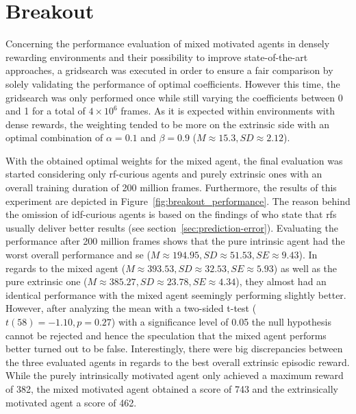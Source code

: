\documentclass[draft,final]{vutinfth} %
\begin{document}
    \section{Breakout}

    Concerning the performance evaluation of mixed motivated agents in densely rewarding environments and their possibility to improve state-of-the-art approaches, a gridsearch was executed in order to ensure a fair comparison by solely validating the performance of optimal coefficients.
    However this time, the gridsearch was only performed once while still varying the coefficients between 0 and 1 for a total of $4\times10^6$ frames.
    As it is expected within environments with dense rewards, the weighting tended to be more on the extrinsic side with an optimal combination of $\alpha=0.1$ and $\beta=0.9$ ($M\approx15.3,SD\approx2.12$).

    With the obtained optimal weights for the mixed agent, the final evaluation was started considering only \gls{rf}-curious agents and purely extrinsic ones with an overall training duration of 200 million frames.
    Furthermore, the results of this experiment are depicted in Figure~\ref{fig:breakout_performance}.
    The reason behind the omission of \gls{idf}-curious agents is based on the findings of \citet{burda_large-scale_2018-1} who state that \glspl{rf} usually deliver better results (see section~\ref{sec:prediction-error}).
    Evaluating the performance after 200 million frames shows that the pure intrinsic agent had the worst overall performance and \gls{se} ($M\approx194.95,SD\approx51.53,SE\approx9.43$).
    In regards to the mixed agent ($M\approx393.53,SD\approx32.53,SE\approx5.93$) as well as the pure extrinsic one ($M\approx385.27,SD\approx23.78,SE\approx4.34$), they almost had an identical performance with the mixed agent seemingly performing slightly better.
    However, after analyzing the mean with a two-sided t-test ($t(58)=-1.10,p=0.27$) with a significance level of 0.05 the null hypothesis cannot be rejected and hence the speculation that the mixed agent performs better turned out to be false.
    Interestingly, there were big discrepancies between the three evaluated agents in regards to the best overall extrinsic episodic reward.
    While the purely intrinsically motivated agent only achieved a maximum reward of 382, the mixed motivated agent obtained a score of 743 and the extrinsically motivated agent a score of 462.
\end{document}

